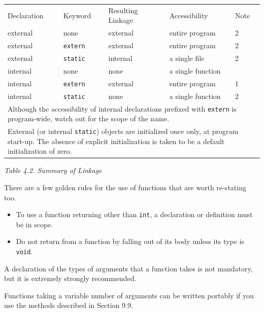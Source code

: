   \begin{tabular}{llllp{\textwidth}}
    Declaration & Keyword & Resulting Linkage & Accessibility & Note
   \\

    external & none & external & entire program & 2
   \\

    external & \texttt{extern} & external & entire program & 2
   \\

    external & \texttt{static} & internal & a single file & 2
   \\

    internal & none & none & a single function & 
   \\

    internal & \texttt{extern} & external & entire program & 1
   \\

    internal & \texttt{static} & none & a single function & 2
   \\
\multicolumn{5}{p{0.9\textwidth}}{Although the accessibility of internal declarations prefixed with
    \texttt{extern} is program-wide, watch out for the scope of the
    name.}\\
\multicolumn{5}{p{0.9\textwidth}}{External (or internal \texttt{static}) objects are initialized
    once only, at program start-up. The absence of explicit initialization
    is taken to be a default initialization of zero.}\\
\end{tabular}

\begin{center}\textit{Table 4.2. Summary of Linkage}\end{center}

    
  There are a few golden rules for the use of functions that are worth
   re-stating too.

  \begin{itemize}
   \item To use a function returning other than \texttt{int}, a
    declaration or definition must be in scope.
   \item Do not return from a function by falling out of its body unless its
    type is \texttt{void}.
  \end{itemize}
  A declaration of the types of arguments that a function takes is not
   mandatory, but it is extremely strongly recommended.


  Functions taking a variable number of arguments can be written portably
   if you use the methods described in Section 9.9.


